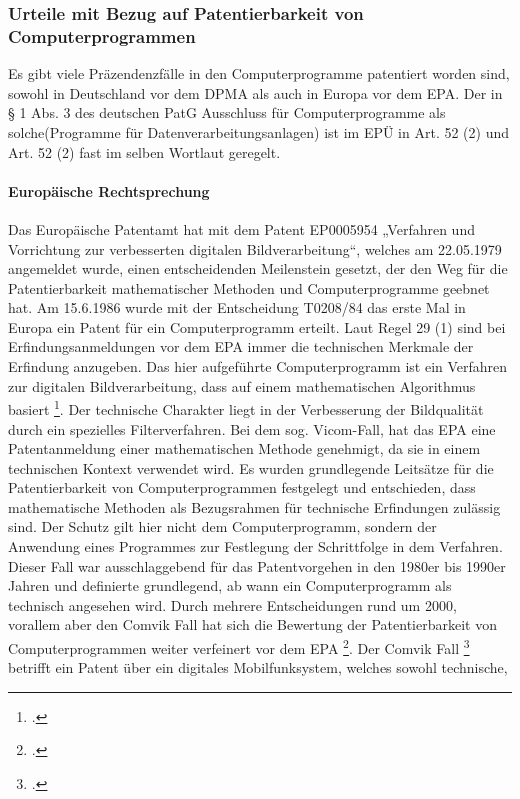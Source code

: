 \subsubsection{Urteile mit Bezug auf Patentierbarkeit von Computerprogrammen}
Es gibt viele Präzendenzfälle in den Computerprogramme patentiert worden sind, 
sowohl in Deutschland vor dem DPMA als auch in Europa vor dem EPA.
Der in § 1 Abs. 3 des deutschen PatG Ausschluss für Computerprogramme als 
solche(Programme für Datenverarbeitungsanlagen) ist im EPÜ in Art. 52 (2) 
und Art. 52 (2) fast im selben Wortlaut geregelt.

\paragraph{Europäische Rechtsprechung}
Das Europäische Patentamt hat mit dem Patent EP0005954 
„Verfahren und Vorrichtung zur verbesserten digitalen Bildverarbeitung“,
welches am 22.05.1979 angemeldet wurde,
einen entscheidenden Meilenstein gesetzt, 
der den Weg für die Patentierbarkeit mathematischer Methoden und 
Computerprogramme geebnet hat. 
Am 15.6.1986 wurde mit der Entscheidung T0208/84 das
erste Mal in Europa ein Patent für ein Computerprogramm erteilt.
Laut Regel 29 (1) sind bei Erfindungsanmeldungen vor dem EPA
immer die 
technischen Merkmale der Erfindung anzugeben.
Das hier aufgeführte Computerprogramm ist ein 
Verfahren zur digitalen Bildverarbeitung, dass
auf einem mathematischen Algorithmus basiert \footcite{EPThisFile}.
Der technische Charakter liegt in der Verbesserung 
der Bildqualität durch ein spezielles Filterverfahren.
Bei dem sog. Vicom-Fall,
hat das EPA eine Patentanmeldung einer
mathematischen Methode genehmigt, da sie in einem technischen Kontext 
verwendet wird. 
Es wurden grundlegende Leitsätze für die Patentierbarkeit von
Computerprogrammen festgelegt und entschieden, dass mathematische
Methoden als Bezugsrahmen für technische Erfindungen zulässig sind.
Der Schutz gilt hier nicht dem Computerprogramm,
sondern der Anwendung eines Programmes 
zur Festlegung der Schrittfolge in dem Verfahren.
Dieser Fall war ausschlaggebend für das Patentvorgehen
in den 1980er bis 1990er Jahren und definierte grundlegend,
ab wann ein Computerprogramm als technisch angesehen wird.
Durch mehrere Entscheidungen rund um 2000, vorallem aber den 
Comvik Fall hat sich die Bewertung der Patentierbarkeit von
Computerprogrammen weiter verfeinert vor dem EPA \footcite{ComvikAnsatz}.
Der Comvik Fall \footcite{064100Zwei} betrifft ein Patent 
über ein digitales Mobilfunksystem, welches sowohl technische,

